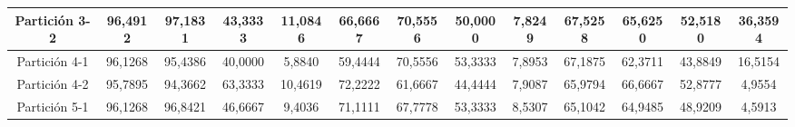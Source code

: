 \documentclass[12pt]{article}
\begin{document}
\begin{table}[H]
{\begin{tabular}{|c|cccc|cccc|cccc|}
Partición 3-2 & \multicolumn{1}{c|}{96,4912}                                                  & \multicolumn{1}{c|}{97,1831}                                                 & \multicolumn{1}{c|}{43,3333} & 11,0846 & \multicolumn{1}{c|}{66,6667}                                                  & \multicolumn{1}{c|}{70,5556}                                                 & \multicolumn{1}{c|}{50,0000} & 7,8249  & \multicolumn{1}{c|}{67,5258}                                                  & \multicolumn{1}{c|}{65,6250}                                                 & \multicolumn{1}{c|}{52,5180} & 36,3594 \\ \hline
Partición 4-1 & \multicolumn{1}{c|}{96,1268}                                                  & \multicolumn{1}{c|}{95,4386}                                                 & \multicolumn{1}{c|}{40,0000} & 5,8840  & \multicolumn{1}{c|}{59,4444}                                                  & \multicolumn{1}{c|}{70,5556}                                                 & \multicolumn{1}{c|}{53,3333} & 7,8953  & \multicolumn{1}{c|}{67,1875}                                                  & \multicolumn{1}{c|}{62,3711}                                                 & \multicolumn{1}{c|}{43,8849} & 16,5154 \\ \hline
Partición 4-2 & \multicolumn{1}{c|}{95,7895}                                                  & \multicolumn{1}{c|}{94,3662}                                                 & \multicolumn{1}{c|}{63,3333} & 10,4619 & \multicolumn{1}{c|}{72,2222}                                                  & \multicolumn{1}{c|}{61,6667}                                                 & \multicolumn{1}{c|}{44,4444} & 7,9087  & \multicolumn{1}{c|}{65,9794}                                                  & \multicolumn{1}{c|}{66,6667}                                                 & \multicolumn{1}{c|}{52,8777} & 4,9554  \\ \hline
Partición 5-1 & \multicolumn{1}{c|}{96,1268}                                                  & \multicolumn{1}{c|}{96,8421}                                                 & \multicolumn{1}{c|}{46,6667} & 9,4036  & \multicolumn{1}{c|}{71,1111}                                                  & \multicolumn{1}{c|}{67,7778}                                                 & \multicolumn{1}{c|}{53,3333} & 8,5307  & \multicolumn{1}{c|}{65,1042}                                                  & \multicolumn{1}{c|}{64,9485}                                                 & \multicolumn{1}{c|}{48,9209} & 4,5913  \\ \hline

\end{tabular}}
\end{table}
\end{document}
